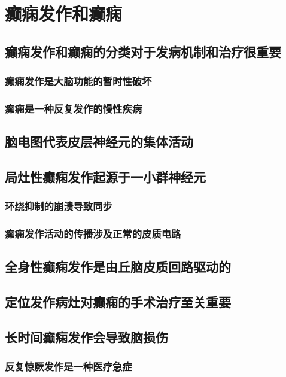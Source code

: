 \chapter{癫痫发作和癫痫}


\section{癫痫发作和癫痫的分类对于发病机制和治疗很重要}
\subsection{癫痫发作是大脑功能的暂时性破坏}
\subsection{癫痫是一种反复发作的慢性疾病}

\section{脑电图代表皮层神经元的集体活动}

\section{局灶性癫痫发作起源于一小群神经元}
\subsection{环绕抑制的崩溃导致同步}
\subsection{癫痫发作活动的传播涉及正常的皮质电路}

\section{全身性癫痫发作是由丘脑皮质回路驱动的}

\section{定位发作病灶对癫痫的手术治疗至关重要}

\section{长时间癫痫发作会导致脑损伤}
\subsection{反复惊厥发作是一种医疗急症}
